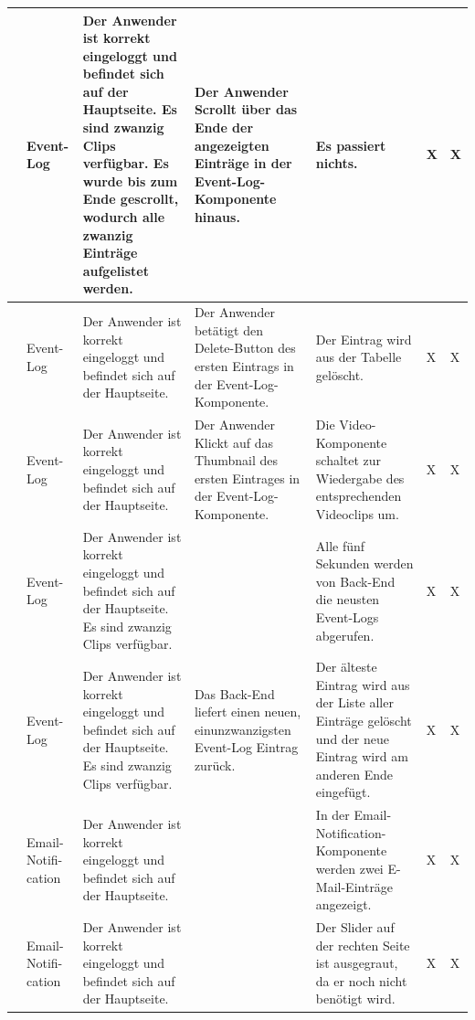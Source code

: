 \begin{longtable}{| p{} | p{} | p{} | p{} | p{} | p{} | p{} |}
	\stepcounter{TestNumber}\arabic{TestNumber} & Event-Log & Der Anwender ist korrekt eingeloggt und befindet sich auf der Hauptseite. Es sind zwanzig Clips verfügbar. Es wurde bis zum Ende gescrollt, wodurch alle zwanzig Einträge aufgelistet werden. & Der Anwender Scrollt über das Ende der angezeigten Einträge in der Event-Log-Komponente hinaus. & Es passiert nichts. & X & X \\ \hline
	
	\stepcounter{TestNumber}\arabic{TestNumber} & Event-Log & Der Anwender ist korrekt eingeloggt und befindet sich auf der Hauptseite. & Der Anwender betätigt den Delete-Button des ersten Eintrags in der Event-Log-Komponente. & Der Eintrag wird aus der Tabelle gelöscht. & X & X \\ \hline
	
	\stepcounter{TestNumber}\arabic{TestNumber} & Event-Log & Der Anwender ist korrekt eingeloggt und befindet sich auf der Hauptseite. & Der Anwender Klickt auf das Thumbnail des ersten Eintrages in der Event-Log-Komponente. & Die Video-Komponente schaltet zur Wiedergabe des entsprechenden Videoclips um. & X & X \\ \hline
	
	\stepcounter{TestNumber}\arabic{TestNumber} & Event-Log & Der Anwender ist korrekt eingeloggt und befindet sich auf der Hauptseite. Es sind zwanzig Clips verfügbar. & & Alle fünf Sekunden werden von Back-End die neusten Event-Logs abgerufen. & X & X \\ \hline
	
	\stepcounter{TestNumber}\arabic{TestNumber} & Event-Log & Der Anwender ist korrekt eingeloggt und befindet sich auf der Hauptseite. Es sind zwanzig Clips verfügbar. & Das Back-End liefert einen neuen, einunzwanzigsten Event-Log Eintrag zurück. & Der älteste Eintrag wird aus der Liste aller Einträge gelöscht und der neue Eintrag wird am anderen Ende eingefügt. & X & X \\ \hline
	
	\stepcounter{TestNumber}\arabic{TestNumber} & Email-Notifi-cation & Der Anwender ist korrekt eingeloggt und befindet sich auf der Hauptseite. & & In der Email-Notification-Komponente werden zwei E-Mail-Einträge angezeigt. & X & X \\ \hline
	
	\stepcounter{TestNumber}\arabic{TestNumber} & Email-Notifi-cation & Der Anwender ist korrekt eingeloggt und befindet sich auf der Hauptseite. & & Der Slider auf der rechten Seite ist ausgegraut, da er noch nicht benötigt wird. & X & X \\ \hline
	

\end{longtable}
